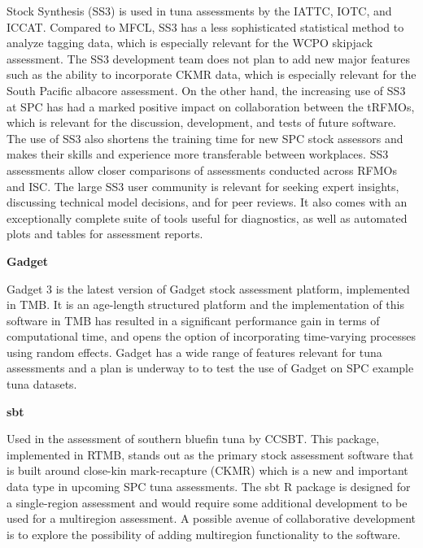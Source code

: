 \documentclass{SCreport}
\begin{document}
Stock Synthesis (SS3) is used in tuna assessments by the IATTC, IOTC, and ICCAT.
Compared to MFCL, SS3 has a less sophisticated statistical method to analyze
tagging data, which is especially relevant for the WCPO skipjack assessment. The
SS3 development team does not plan to add new major features such as the ability
to incorporate CKMR data, which is especially relevant for the South Pacific
albacore assessment. On the other hand, the increasing use of SS3 at SPC has had
a marked positive impact on collaboration between the tRFMOs, which is relevant
for the discussion, development, and tests of future software. The use of SS3
also shortens the training time for new SPC stock assessors and makes their
skills and experience more transferable between workplaces. SS3 assessments
allow closer comparisons of assessments conducted across RFMOs and ISC. The
large SS3 user community is relevant for seeking expert insights, discussing
technical model decisions, and for peer reviews. It also comes with an
exceptionally complete suite of tools useful for diagnostics, as well as
automated plots and tables for assessment reports.

\vspace{1ex}

\textbf{Gadget}

Gadget 3 is the latest version of Gadget stock assessment platform, implemented
in TMB. It is an age-length structured platform and the implementation of this
software in TMB has resulted in a significant performance gain in terms of
computational time, and opens the option of incorporating time-varying processes
using random effects. Gadget has a wide range of features relevant for tuna
assessments and a plan is underway to to test the use of Gadget on SPC example
tuna datasets.

\vspace{1ex}

\textbf{sbt}

Used in the assessment of southern bluefin tuna by CCSBT. This package,
implemented in RTMB, stands out as the primary stock assessment software that is
built around close-kin mark-recapture (CKMR) which is a new and important data
type in upcoming SPC tuna assessments. The \textsf{sbt} R package is designed
for a single-region assessment and would require some additional development to
be used for a multiregion assessment. A possible avenue of collaborative
development is to explore the possibility of adding multiregion functionality to
the software.
\end{document}
